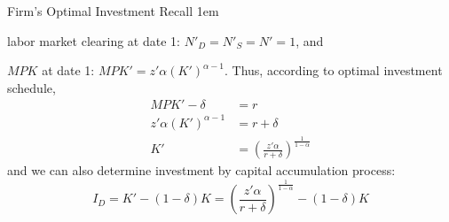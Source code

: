 \documentclass[11pt,aspectratio=43]{beamer}
\let\olditemize=\itemize
\let\endolditemize=\enditemize
\renewenvironment{itemize}{\olditemize \itemsep1em}{\endolditemize}
\theoremstyle{definition}
\begin{document}
\begin{frame}{Firm's Optimal Investment}
\label{slide:Firm_s_Optimal_Investment}
    Recall
    \begin{itemize}
        \item labor market clearing at date 1: $ N'_{D} = N'_{S} = N' = 1 $, and
        \item $ MPK $ at date 1: $ MPK' = z' \alpha ( K' )^{\alpha-1}$.
    \end{itemize}
    Thus, according to optimal investment schedule,
    \begin{align*}
        MPK' - \delta
            &= r
        \\
        z' \alpha ( K' )^{\alpha-1}
            &=  r + \delta
        \\
        K'
            &= \left(
                \frac{z' \alpha}{r+\delta}
            \right)^{\frac{1}{1-\alpha}}
    \end{align*}
    and we can also determine investment by capital accumulation process:
    \begin{equation*}
        I_{D} = K' - ( 1-\delta)K
          = \left(
                \frac{z' \alpha}{r+\delta}
            \right)^{\frac{1}{1-\alpha}}
            - ( 1-\delta )K
    \end{equation*}
\end{frame}
\end{document}
